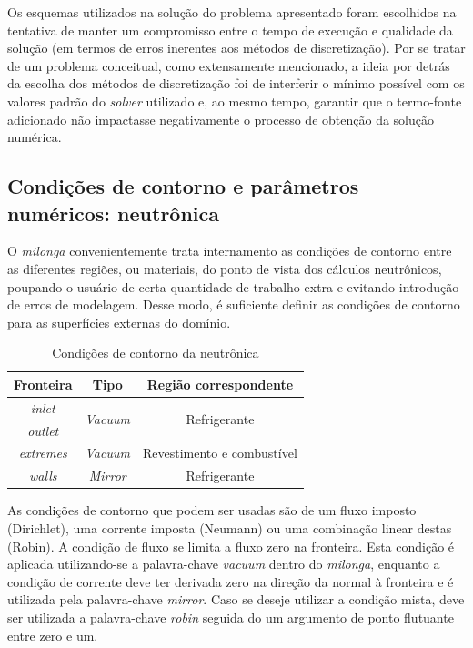 Os esquemas utilizados na solução do problema apresentado foram escolhidos na tentativa de manter
um compromisso entre o tempo de execução e qualidade da solução (em termos de erros inerentes
aos métodos de discretização). Por se tratar de um problema conceitual, como extensamente mencionado,
a ideia por detrás da escolha dos métodos de discretização foi de interferir o mínimo possível com
os valores padrão do \textit{solver} utilizado e, ao mesmo tempo, garantir que o termo-fonte
adicionado não impactasse negativamente o processo de obtenção da solução numérica.


\subsection{Condições de contorno e parâmetros numéricos: neutrônica}
\label{ssec:neutro}

O \textit{milonga} convenientemente trata internamento as condições de contorno
entre as diferentes regiões, ou materiais, do ponto de vista dos cálculos neutrônicos,
poupando o usuário de certa quantidade de trabalho extra e evitando introdução
de erros de modelagem. Desse modo, é suficiente definir as condições de contorno
para as superfícies externas do domínio.

\begin{table}[htb]
  \centering
\caption{Condições de contorno da neutrônica}
\label{tab:cc-neut}
\begin{tabular}{ccc}
Fronteira         & Tipo                             & Região correspondente         \\ \hline
\textit{inlet}    & \multirow{2}{*}{\textit{Vacuum}} & \multirow{2}{*}{Refrigerante} \\
\textit{outlet}   &                                  &                               \\ \cline{1-1}
\textit{extremes} & \textit{Vacuum}                  & Revestimento e combustível    \\ \hline
\textit{walls}    & \textit{Mirror}                  & Refrigerante                 
\end{tabular}
\end{table}

As condições de contorno que podem ser usadas são de um fluxo imposto (Dirichlet),
uma corrente imposta (Neumann) ou uma combinação linear destas (Robin). A condição de
fluxo se limita a fluxo zero na fronteira. Esta condição é aplicada utilizando-se
a palavra-chave \textit{vacuum} dentro do \textit{milonga}, enquanto a condição
de corrente deve ter derivada zero na direção da normal à fronteira e é utilizada
pela palavra-chave \textit{mirror}. Caso se deseje utilizar a condição mista, deve
ser utilizada a palavra-chave \textit{robin} seguida do um argumento de ponto
flutuante entre zero e um.

